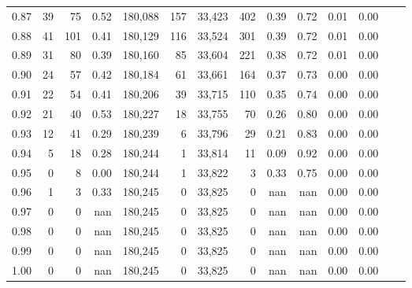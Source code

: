 \begin{tabular}{rrrrrrrrrrrrrr}
0.87 &     39 &   75 &    0.52 &  180,088 &      157 &  33,423 &     402 &  0.39 &  0.72 &  0.01 &      0.00 \\
0.88 &     41 &  101 &    0.41 &  180,129 &      116 &  33,524 &     301 &  0.39 &  0.72 &  0.01 &      0.00 \\
0.89 &     31 &   80 &    0.39 &  180,160 &       85 &  33,604 &     221 &  0.38 &  0.72 &  0.01 &      0.00 \\
0.90 &     24 &   57 &    0.42 &  180,184 &       61 &  33,661 &     164 &  0.37 &  0.73 &  0.00 &      0.00 \\
0.91 &     22 &   54 &    0.41 &  180,206 &       39 &  33,715 &     110 &  0.35 &  0.74 &  0.00 &      0.00 \\
0.92 &     21 &   40 &    0.53 &  180,227 &       18 &  33,755 &      70 &  0.26 &  0.80 &  0.00 &      0.00 \\
0.93 &     12 &   41 &    0.29 &  180,239 &        6 &  33,796 &      29 &  0.21 &  0.83 &  0.00 &      0.00 \\
0.94 &      5 &   18 &    0.28 &  180,244 &        1 &  33,814 &      11 &  0.09 &  0.92 &  0.00 &      0.00 \\
0.95 &      0 &    8 &    0.00 &  180,244 &        1 &  33,822 &       3 &  0.33 &  0.75 &  0.00 &      0.00 \\
0.96 &      1 &    3 &    0.33 &  180,245 &        0 &  33,825 &       0 &   nan &   nan &  0.00 &      0.00 \\
0.97 &      0 &    0 &     nan &  180,245 &        0 &  33,825 &       0 &   nan &   nan &  0.00 &      0.00 \\
0.98 &      0 &    0 &     nan &  180,245 &        0 &  33,825 &       0 &   nan &   nan &  0.00 &      0.00 \\
0.99 &      0 &    0 &     nan &  180,245 &        0 &  33,825 &       0 &   nan &   nan &  0.00 &      0.00 \\
1.00 &      0 &    0 &     nan &  180,245 &        0 &  33,825 &       0 &   nan &   nan &  0.00 &      0.00 \\
\bottomrule
\end{tabular}
